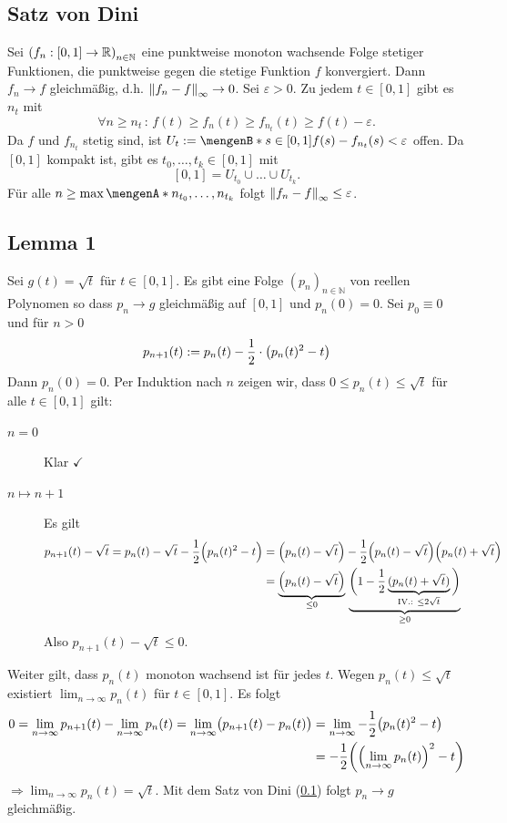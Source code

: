 \subsection{Satz von Dini} %
\label{sub:64}
Sei $\enbrace*{f_n : [0,1] \to \mathds{R}}_{n \in \mathds{N}}$ eine punktweise monoton wachsende Folge stetiger Funktionen, die punktweise gegen die stetige Funktion $f$
konvergiert. Dann $f_n \to f$ gleichmäßig, d.h. $\norm[\infty]{f_n -f} \to 0 $.
Sei $\varepsilon >0$. Zu jedem $t \in [0,1]$ gibt es $n_t$ mit 
\[
	\forall n\ge n_t \, : \, f(t) \ge f_n(t) \ge f_{n_t}(t) \ge f(t) - \varepsilon. 
\]
Da $f$ und $f_{n_t}$ stetig sind,
ist $U_t := \set[{s \in [0,1]}]{f(s) - f_{n_t}(s) < \varepsilon} $ offen. Da $[0,1]$ kompakt ist, gibt es $t_0, \ldots , t_k \in [0,1]$ mit 
\[
	[0,1] = U_{t_0} \cup \ldots \cup U_{t_k}.
\]
Für alle $n \ge \max \set{n_{t_0}, \ldots , n_{t_k}} $ folgt
\(
	\norm[\infty]{f_n - f} \le \varepsilon
\). \bewende 

\subsection[Lemma 1: Folge reeller Polynome, die gleichmäßig gegen Wurzelfunktion konvergiert]{Lemma 1} %
\label{sub:65}
Sei $g(t) = \sqrt{t}$ für $t \in [0,1]$. Es gibt eine Folge $(p_n)_{n \in \mathds{N}}$ von reellen Polynomen so dass $p_n \to g$ gleichmäßig auf $[0,1]$ und $p_n(0)=0$.
Sei $p_0 \equiv 0$ und für $n > 0$
\[
	p_{n+1} (t) := p_n(t) - \frac{1}{2} \cdot \enbrace[\big]{p_n(t)^2 - t} 
\]
Dann $p_n(0)=0$. Per Induktion nach $n$ zeigen wir, dass $0 \le p_n(t) \le \sqrt{t}$ für alle $t \in [0,1]$ gilt:
\begin{description}
	\item[\uline{$n=0$}] Klar $\checkmark$ 
	\item[\uline{$n \mapsto n+1$}] Es gilt \begin{align*}
		p_{n+1}(t) - \sqrt{t} = p_n(t) - \sqrt{t} - \frac{1}{2} \enbrace[\Big]{p_n(t)^2 -t} &= \enbrace*{p_n(t) - \sqrt{t} }- \frac{1}{2} \enbrace*{p_n(t)- \sqrt{t}} 
		\enbrace*{p_n(t) + \sqrt{t}}        \\
		&=\underbrace{\enbrace*{p_n(t) - \sqrt{t}  } }_{\le 0} \, \underbrace{\bigg( 1- \frac{1}{2}\underbrace{(p_n(t) + \sqrt{t}  )}_{\text{IV.: }\le 2 \sqrt{t}} \bigg)
		}_{\ge 0} 
	\end{align*}
	Also $p_{n+1}(t)- \sqrt{t} \le 0$. 
\end{description}
Weiter gilt, dass $p_n(t)$ monoton wachsend ist für jedes $t$. Wegen $p_n(t) \le \sqrt{t}$ existiert $\lim_{ n \to \infty} p_n(t)$
für $t \in [0,1]$. Es folgt 
\begin{align*}
	0 = \lim_{ n \to \infty} p_{n+1}(t) - \lim_{ n \to \infty} p_n(t) = \lim_{ n \to \infty} \enbrace[\big]{p_{n+1}(t) - p_n(t)} &= \lim_{ n \to \infty} 
	-\frac{1}{2} \enbrace[\big]{p_n(t)^2 -t  } \\
	&= - \frac{1}{2} \enbrace*{ \enbrace*{\lim_{ n \to \infty} p_n(t)}^2 -t }  
\end{align*}
$\Longrightarrow \lim_{ n \to \infty} p_n(t) = \sqrt{t}$. Mit dem Satz von Dini (\ref{sub:64}) folgt $p_n \to g$ gleichmäßig. \bewende

